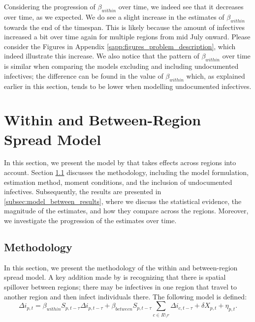 \documentclass[12pt]{article}
\begin{document}
	Considering the progression of $\beta_{within}$ over time, we indeed see that it decreases over time, as we expected. We do see a slight increase in the estimates of $\beta_{within}$ towards the end of the timespan. This is likely because the amount of infectives increased a bit over time again for multiple regions from mid July onward. Please consider the Figures in Appendix \ref{sapp:figures_problem_description}, which indeed illustrate this increase. We also notice that the pattern of $\beta_{within}$ over time is similar when comparing the models excluding and including undocumented infectives; the difference can be found in the value of $\beta_{within}$ which, as explained earlier in this section, tends to be lower when modelling undocumented infectives.
	
	\section{Within and Between-Region Spread Model} \label{sec:model_between}
	In this section, we present the model by \textcite{adda2016economic} that takes effects across regions into account. Section \ref{subsec:model_between_methodology} discusses the methodology, including the model formulation, estimation method, moment conditions, and the inclusion of undocumented infectives. Subsequently, the results are presented in \ref{subsec:model_between_results}, where we discuss the statistical evidence, the magnitude of the estimates, and how they compare across the regions. Moreover, we investigate the progression of the estimates over time.
	
	\subsection{Methodology} \label{subsec:model_between_methodology}
	In this section, we present the methodology of the within and between-region spread model. A key addition made by \textcite{adda2016economic} is recognizing that there is spatial spillover between regions; there may be infectives in one region that travel to another region and then infect individuals there. The following model is defined:
	\begin{equation} \label{eq:model_between}
	    \Delta i_{p,t} = \beta_{within}S_{p,t-\tau}\Delta i_{p,t-\tau} + \beta_{between}S_{p,t-\tau} \sum_{c \in R \setminus r} \Delta i_{c, t-\tau} + \delta X_{p,t} + \eta_{p,t}.
	\end{equation}
	
\end{document}
